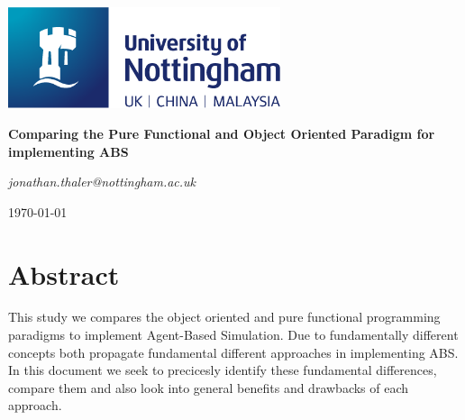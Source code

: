\documentclass[oneside]{book}
\begin{document}
\begin{titlepage}
	\centering
	\includegraphics[width=0.60\textwidth]{../../logo/UoN_Primary_Logo_RGB.png}\par\vspace{1cm}
	\vspace{1.5cm}
	{\huge\bfseries Comparing the Pure Functional and Object Oriented Paradigm for implementing ABS \par}
	\vspace{2cm}
	{\Large\itshape jonathan.thaler@nottingham.ac.uk \par}
	\vfill
	
	\vfill

	{\large \today\par}
\end{titlepage}

\cleardoublepage

\section*{Abstract}
This study we compares the object oriented and pure functional programming paradigms to implement Agent-Based Simulation. Due to fundamentally different concepts both propagate fundamental different approaches in implementing ABS. In this document we seek to precicesly identify these fundamental differences, compare them and also look into general benefits and drawbacks of each approach.

\clearpage
\tableofcontents
\clearpage



\renewcommand\bibname{References}



\end{document}
